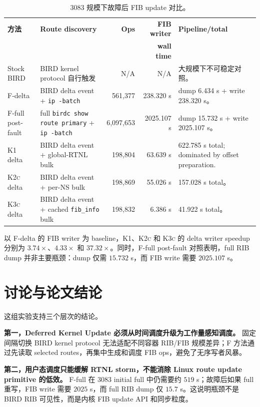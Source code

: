 \documentclass[UTF8]{ctexart}
\newcommand{\code}[1]{\texttt{#1}}
\newcommand{\method}[1]{\textsc{#1}}
\begin{document}
\begin{table}[t]
\centering
\small
\caption{3083 规模下故障后 FIB update 对比。}
\label{tab:reconv}
\begin{tabularx}{\textwidth}{p{}YrrY}
\toprule
\textbf{方法} & \textbf{Route discovery} & \textbf{Ops} & \textbf{FIB writer} & \textbf{Pipeline/total} \\
 & & & \textbf{wall time} & \\
\midrule
Stock BIRD &
BIRD kernel protocol 自行触发 &
N/A & N/A &
大规模下不可稳定对照。 \\
\method{F}-delta &
BIRD delta event + \code{ip -batch} &
561,377 & 238.320 s &
dump 6.434 s + write 238.320 s。 \\
\method{F}-full post-fault &
full \code{birdc show route primary} + \code{ip -batch} &
6,097,653 & 2025.107 s &
dump 15.732 s + write 2025.107 s。 \\
\method{K1} delta &
BIRD delta event + global-RTNL bulk &
198,804 & 63.639 s &
622.785 s total; dominated by offset preparation. \\
\method{K2c} delta &
BIRD delta event + per-NS bulk &
198,869 & 55.026 s &
157.028 s total。 \\
\method{K3c} delta &
BIRD delta event + cached \code{fib\_info} bulk &
198,832 & 6.386 s &
41.922 s total。 \\
\bottomrule
\end{tabularx}
\end{table}

以 \method{F}-delta 的 FIB writer 为 baseline，\method{K1}、\method{K2c} 和 \method{K3c} 的 delta writer speedup 分别为 $3.74\times$、$4.33\times$ 和 $37.32\times$。同时，\method{F}-full post-fault 对照表明，full RIB dump 并非主要瓶颈：dump 仅需 $15.732$ s，而 FIB write 需要 $2025.107$ s。

\section{讨论与论文结论}

这组实验支持三个层次的结论。

\textbf{第一，Deferred Kernel Update 必须从时间调度升级为工作量感知调度。}
固定间隔切换 BIRD kernel protocol 无法适配不同容器 RIB/FIB 规模差异；\method{F} 方法通过先读取 selected routes，再集中生成和调度 FIB ops，避免了无序写者风暴。

\textbf{第二，用户态调度只能缓解 RTNL storm，不能消除 Linux route update primitive 的低效。}
\method{F}-full 在 3083 initial full 中仍需要约 $519$ s；故障后如果 full 重写，FIB write 需要 $2025$ s，而 full RIB dump 仅 $15.7$ s。这说明瓶颈不是 BIRD RIB 可见性，而是内核 FIB update API 和同步粒度。
\end{document}
